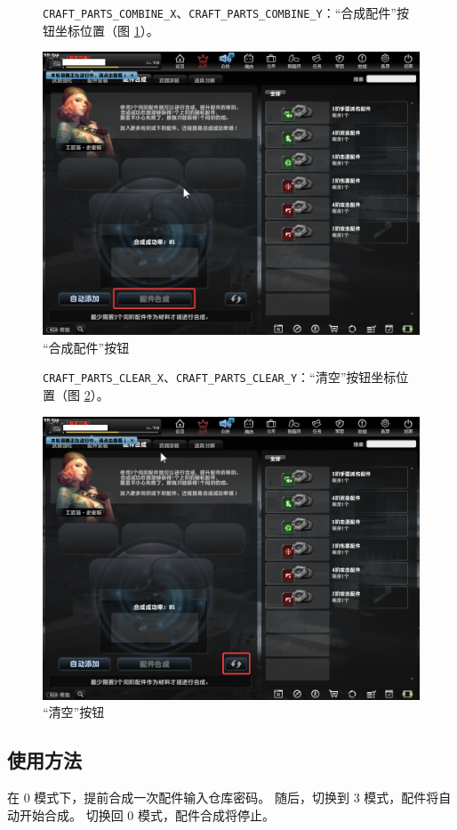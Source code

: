 \begin{figure}[H]
    \Centering
    \parbox[l]{\textwidth}{\lstinline{CRAFT_PARTS_COMBINE_X}、\lstinline{CRAFT_PARTS_COMBINE_Y}：“合成配件”按钮坐标位置（图 \ref{ch3fig-combine}）。}
    \includegraphics[width=\textwidth]{docs/assets/combine.png}
    \caption{“合成配件”按钮}
    \label{ch3fig-combine}
\end{figure}
\clearpage

\begin{figure}[H]
    \Centering
    \parbox[l]{\textwidth}{\lstinline{CRAFT_PARTS_CLEAR_X}、\lstinline{CRAFT_PARTS_CLEAR_Y}：“清空”按钮坐标位置（图 \ref{ch3fig-clear}）。}
    \includegraphics[width=\textwidth]{docs/assets/clear.png}
    \caption{“清空”按钮}
    \label{ch3fig-clear}
\end{figure}
\clearpage

\subsection{使用方法}

在 0 模式下，提前合成一次配件输入仓库密码。
随后，切换到 3 模式，配件将自动开始合成。
切换回 0 模式，配件合成将停止。